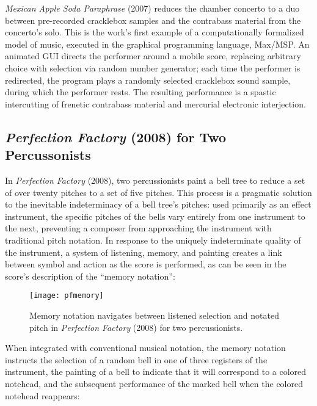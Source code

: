 \emph{Mexican Apple Soda Paraphrase} (2007) reduces the chamber concerto to a duo between pre-recorded cracklebox samples and the contrabass material from the concerto's solo. This is the work's first example of a computationally formalized model of music, executed in the graphical programming language, Max/MSP. An animated GUI directs the performer around a mobile score, replacing arbitrary choice with selection via random number generator; each time the performer is redirected, the program plays a randomly selected cracklebox sound sample, during which the performer rests. The resulting performance is a spastic intercutting of frenetic contrabass material and mercurial electronic interjection. 

\subsection{\emph{Perfection Factory} (2008) for Two Percussonists}

In \emph{Perfection Factory} (2008), two percussionists paint a bell tree to reduce a set of over twenty pitches to a set of five pitches. This process is a pragmatic solution to the inevitable indeterminacy of a bell tree's pitches: used primarily as an effect instrument, the specific pitches of the bells vary entirely from one instrument to the next, preventing a composer from approaching the instrument with traditional pitch notation. In response to the uniquely indeterminate quality of the instrument, a system of listening, memory, and painting creates a link between symbol and action as the score is performed, as can be seen in the score's description of the ``memory notation'':

\begin{figure}[H] 
\texttt{[image: pfmemory]}
\caption{Memory notation navigates between listened selection and notated pitch in \emph{Perfection Factory} (2008) for two percussionists. } 
\end{figure}

When integrated with conventional musical notation, the memory notation instructs the selection of a random bell in one of three registers of the instrument, the painting of a bell to indicate that it will correspond to a colored notehead, and the subsequent performance of the marked bell when the colored notehead reappears: 

